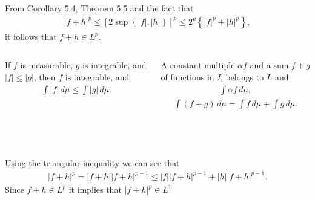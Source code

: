 \documentclass{beamer}
\numberwithin{equation}{section}
\begin{document}
\begin{frame}\frametitle{{\normalsize \secname} \\ {\large \subsecname}}
    From Corollary 5.4, Theorem 5.5 and the fact that
    \begin{align}
        |f + h|^p \leq \left[2 \sup\left\{|f|, |h|\right\}\right]^p \leq 2^p\left\{|f|^p + |h|^p\right\},
    \end{align}
    it follows that $f + h \in L^p$.
    \begingroup
    \small
    \begin{columns}
        \begin{column}{0.4\textwidth}
            \begin{corollary}[5.4]
                If $f$ is measurable, $g$ is integrable, and $|f| \leq |g|$, then $f$ is integrable, and
                \begin{align}
                    \int |f| \, d\mu \leq \int |g| \, d\mu.
                \end{align}
            \end{corollary}
        \end{column}
        \begin{column}{0.6\textwidth}
            \begin{theorem}[5.5]
                A constant multiple $\alpha f$ and a sum $f + g$ of functions in $L$ belongs to $L$ and
                \begin{align}
                    \int \alpha f \, d\mu,
                \end{align}
                \begin{align}
                    \int (f + g) \, d\mu = \int f \, d\mu + \int g \, d\mu.
                \end{align}
            \end{theorem}
        \end{column}
    \end{columns}
    \endgroup
\end{frame}

\begin{frame}\frametitle{{\normalsize \secname} \\ {\large \subsecname}}
    Using the triangular inequality we can see that
    \begin{align}
        |f + h|^p = |f + h||f + h|^{p - 1} \leq |f||f + h|^{p - 1} + |h||f + h|^{p - 1}.
    \end{align}
    Since $f + h \in L^p$ it implies that $|f + h|^p \in L^1$
\end{frame}
\end{document}
